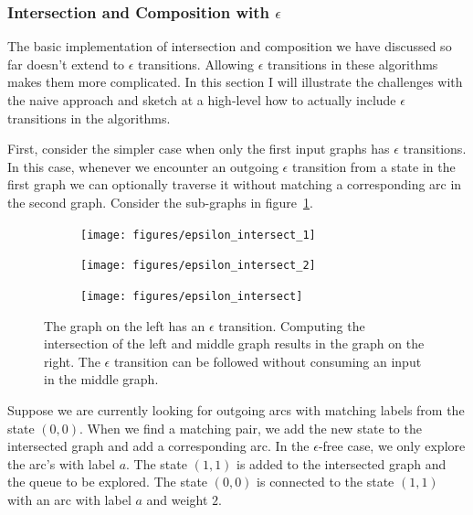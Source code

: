 \subsubsection{Intersection and Composition with $\epsilon$}
\label{sec:epsilon_intersect}

The basic implementation of intersection and composition we have discussed so
far doesn't extend to $\epsilon$ transitions. Allowing $\epsilon$ transitions
in these algorithms makes them more complicated. In this section I will
illustrate the challenges with the naive approach and sketch at a high-level
how to actually include $\epsilon$ transitions in the algorithms.

First, consider the simpler case when only the first input graphs has
$\epsilon$ transitions. In this case, whenever we encounter an outgoing
$\epsilon$ transition from a state in the first graph we can optionally
traverse it without matching a corresponding arc in the second graph. Consider
the sub-graphs in figure~\ref{fig:epsilon_intersect}.

\begin{figure}
    \centering
    \begin{subfigure}{0.32\textwidth}
        \centering
        \texttt{[image: figures/epsilon\_intersect\_1]}
    \end{subfigure}
    \begin{subfigure}{0.32\textwidth}
        \centering
        \texttt{[image: figures/epsilon\_intersect\_2]}
    \end{subfigure}
    \begin{subfigure}{0.32\textwidth}
        \centering
        \texttt{[image: figures/epsilon\_intersect]}
    \end{subfigure}
    \caption{The graph on the left has an $\epsilon$ transition. Computing the
    intersection of the left and middle graph results in the graph on the
    right. The $\epsilon$ transition can be followed without consuming an input
    in the middle graph.}
    \label{fig:epsilon_intersect}
\end{figure}

Suppose we are currently looking for outgoing arcs with matching labels from
the state $(0, 0)$. When we find a matching pair, we add the new state to the
intersected graph and add a corresponding arc. In the $\epsilon$-free case, we
only explore the arc's with label $a$. The state $(1, 1)$ is added to the
intersected graph and the queue to be explored. The state $(0, 0)$ is connected
to the state $(1, 1)$ with an arc with label $a$ and weight $2$.

